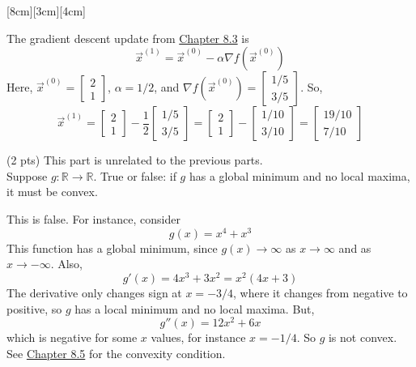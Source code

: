 \documentclass[11pt]{article}
\begin{document}
\begin{prob}
\begin{subprob}
[8cm][3cm][4cm]
\begin{solution}
The gradient descent update from \href{https://notes.eecs245.org/gradients/gradient-descent/}{Chapter 8.3} is
\[
\vec{x}^{(1)}
=
\vec{x}^{(0)}-\alpha\nabla f(\vec{x}^{(0)})
\]
Here, $\vec{x}^{(0)}=\begin{bmatrix}2\\1\end{bmatrix}$, $\alpha=1/2$, and $\nabla f(\vec{x}^{(0)})=\begin{bmatrix}1/5\\3/5\end{bmatrix}$. So,
\[
\vec{x}^{(1)}
=
\begin{bmatrix}2\\1\end{bmatrix}
-
\frac{1}{2}\begin{bmatrix}1/5\\3/5\end{bmatrix}
=
\begin{bmatrix}2\\1\end{bmatrix}
-
\begin{bmatrix}1/10\\3/10\end{bmatrix}
=
\begin{bmatrix}19/10\\7/10\end{bmatrix}
\]
\end{solution}
\end{subprob}


\begin{subprob}(2 pts) This part is unrelated to the previous parts. \\
    
Suppose $g: \mathbb{R} \to \mathbb{R}$. True or false: if $g$ has a global minimum and no local maxima, it must be convex.


 

\begin{solution}
This is false. For instance, consider
\[
g(x)=x^4+x^3
\]
This function has a global minimum, since $g(x)\to\infty$ as $x\to\infty$ and as $x\to-\infty$. Also,
\[
g'(x)=4x^3+3x^2=x^2(4x+3)
\]
The derivative only changes sign at $x=-3/4$, where it changes from negative to positive, so $g$ has a local minimum and no local maxima. But,
\[
g''(x)=12x^2+6x
\]
which is negative for some $x$ values, for instance $x=-1/4$. So $g$ is not convex. See \href{https://notes.eecs245.org/gradients/convexity/}{Chapter 8.5} for the convexity condition.


\end{solution}
\end{subprob}
\end{prob}
\end{document}
